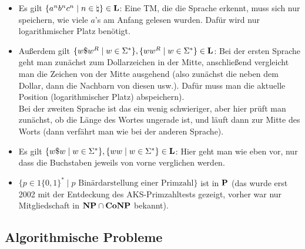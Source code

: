 \begin{Bsp}
    \begin{itemize}
        \item
        Es gilt $\{a^n b^n c^n \;|\; n \in \natural\} \in \L$:
        Eine TM, die die Sprache erkennt, muss sich nur speichern, wie viele $a$'s am Anfang
        gelesen wurden.
        Dafür wird nur logarithmischer Platz benötigt.

        \item
        Außerdem gilt $\{w \dollar w^R \;|\; w \in \Sigma^\ast\},
        \{w w^R \;|\; w \in \Sigma^\ast\} \in \L$:
        Bei der ersten Sprache geht man zunächst zum Dollarzeichen in der Mitte,
        anschließend vergleicht man die Zeichen
        von der Mitte ausgehend (also zunächst die neben dem Dollar, dann die Nachbarn von
        diesen usw.).
        Dafür muss man die aktuelle Position (logarithmischer Platz) abspeichern).\\
        Bei der zweiten Sprache ist das ein wenig schwieriger, aber hier prüft man zunächst,
        ob die Länge des Wortes ungerade ist, und läuft dann zur Mitte des Worts
        (dann verfährt man wie bei der anderen Sprache).

        \item
        Es gilt $\{w \dollar w \;|\; w \in \Sigma^\ast\},
        \{w w \;|\; w \in \Sigma^\ast\} \in \L$:
        Hier geht man wie eben vor, nur dass die Buchstaben jeweils von vorne verglichen werden.

        \item
        $\{p \in 1\{0, 1\}^\ast \;|\; p \text{ Binärdarstellung einer Primzahl}\}$ ist in $\P$
        (das wurde erst 2002 mit der Entdeckung des AKS-Primzahltests
        gezeigt, vorher war nur Mitgliedschaft in $\NP \cap \Co\NP$ bekannt).
    \end{itemize}
\end{Bsp}

\subsection{%
    Algorithmische Probleme%
}

